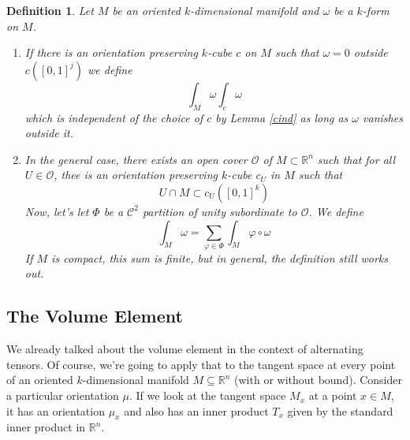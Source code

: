\documentclass{article}
\newtheorem{definition}{Definition}
\newcommand{\reals}[0]{\mathbb{R}}
\newcommand{\mc}[1]{\mathcal{#1}}
\begin{document}
\begin{definition}
  Let \(M\) be an oriented \(k\)-dimensional manifold and \(\omega\) be a \(k\)-form on \(M\).
  \begin{enumerate}

    \item If there is an orientation preserving \(k\)-cube \(c\) on \(M\) such that \(\omega = 0\) outside \(c([0, 1]^j)\) we define
    \begin{equation}
      \int_M\omega \int_c\omega
    \end{equation}
    which is independent of the choice of \(c\) by Lemma \ref{cind} as long as \(\omega\) vanishes outside it.

    \item In the general case, there exists an open cover \(\mc{O}\) of \(M \subset \reals^n\) such that for all \(U \in \mc{O}\), thee is an orientation preserving \(k\)-cube \(c_U\) in \(M\) such that
    \begin{equation}
      U \cap M \subset c_U([0, 1]^k)
    \end{equation}
    Now, let's let \(\Phi\) be a \(\mc{C}^2\) partition of unity subordinate to \(\mc{O}\). We define
    \begin{equation}
      \int_M\omega = \sum_{\varphi \in \Phi}\int_{M}\varphi \circ \omega
    \end{equation}
    If \(M\) is compact, this sum is finite, but in general, the definition still works out.

  \end{enumerate}
\end{definition}


\subsection{The Volume Element}

We already talked about the volume element in the context of alternating tensors. Of course, we're going to apply that to the tangent space at every point of an oriented \(k\)-dimensional manifold \(M \subseteq \reals^n\) (with or without bound). Consider a particular orientation \(\mu\). If we look at the tangent space \(M_x\) at a point \(x \in M\), it has an orientation \(\mu_x\) and also has an inner product \(T_x\) given by the standard inner product in \(\reals^n\).
\end{document}
